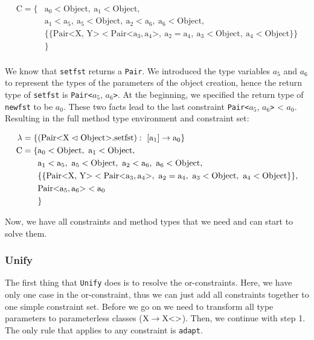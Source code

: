 \begin{align*}
    \text{C} = \{& \text{a}_0 < \text{Object}, \ \text{a}_1 < \text{Object}, \\
    &\text{a}_1 < \text{a}_5, \ \text{a}_5 < \text{Object}, \ \text{a}_2 < \text{a}_6, \ \text{a}_6 < \text{Object}, \\
    & \{ \{ \text{Pair<X, Y>} < \text{Pair<} \text{a}_3, \text{a}_4 \text{>}, \ \text{a}_2 = \text{a}_4, \ \text{a}_3 < \text{Object}, \ \text{a}_4 < \text{Object} \} \} \\
    &\}\\
\end{align*}

We know that \verb|setfst| returns a \verb|Pair|. We introduced the type variables $a_5$ and $a_6$ to represent the types of the parameters of the object creation, hence the return type of \verb|setfst| is \verb|Pair<|$a_5$, $a_6$\verb|>|.
At the beginning, we specified the return type of \verb|newfst| to be $a_0$. These two facts lead to the last constraint \verb|Pair<|$a_5$, $a_6$\verb|>| < $a_0$.
Resulting in the full method type environment and constraint set:

\begin{align*}
    \lambda = \{& ( \cxnm{Pair}{X}{Object}{setfst} ): \ [\text{a}_1] \to \text{a}_0 \}\\
    \text{C} = \{& \text{a}_0 < \text{Object}, \ \text{a}_1 < \text{Object}, \\
    &\text{a}_1 < \text{a}_5, \ \text{a}_5 < \text{Object}, \ \text{a}_2 < \text{a}_6, \ \text{a}_6 < \text{Object}, \\
    & \{ \{ \text{Pair<X, Y>} < \text{Pair<} \text{a}_3, \text{a}_4 \text{>}, \ \text{a}_2 = \text{a}_4, \ \text{a}_3 < \text{Object}, \ \text{a}_4 < \text{Object} \} \},\\
    &\text{Pair<}\text{a}_5, \text{a}_6\text{>} < \text{a}_0\\
    &\}\\
\end{align*}

Now, we have all constraints and method types that we need and can start to solve them.

\subsubsection{Unify}
The first thing that \verb|Unify| does is to resolve the or-constraints. Here, we have only one case in the or-constraint, thus we can just add all constraints together to one simple constraint set.
Before we go on we need to transform all type parameters to parameterless classes ($\text{X} \to \text{X} \text{<}  \text{>}$).
Then, we continue with step 1. The only rule that applies to any constraint is \verb|adapt|.

